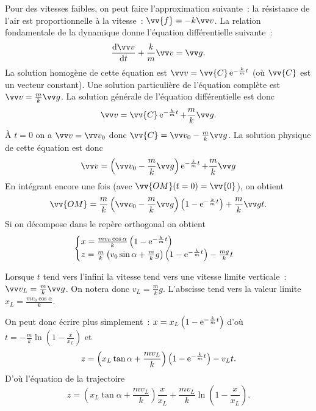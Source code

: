 Pour des vitesses faibles, on peut faire l'approximation suivante~: la résistance de l'air est proportionnelle à la vitesse~: \(\vv{f}=-k \vvv\). La relation fondamentale de la dynamique donne l'équation différentielle suivante~:
\begin{equation}
  \derived{\vvv}{t}+\frac{k}{m}\vvv = \vg.
\end{equation}
La solution homogène de cette équation est \(\vvv = \vv{C}\e^{-\frac{k}{m}t}\) (où \(\vv{C}\) est un vecteur constant). Une solution particulière de l'équation complète est \(\vvv = \frac{m}{k}\vg\). La solution générale de l'équation différentielle est donc
\begin{equation}
  \vvv = \vv{C}\e^{-\frac{k}{m}t} + \frac{m}{k}\vg.
\end{equation}
À \(t=0\) on a \(\vvv=\vvv_0\) donc \(\vv{C}=\vvv_0 - \frac{m}{k}\vg\). La solution physique de cette équation est donc
\begin{equation}
  \vvv = \left( \vvv_0 - \frac{m}{k}\vg \right) \e^{-\frac{k}{m}t} + \frac{m}{k}\vg
\end{equation}
En intégrant encore une fois (avec \(\vv{OM}(t=0)=\vv{0}\)), on obtient
\begin{equation}
  \vv{OM} = \frac{m}{k}\left(\vvv_0 - \frac{m}{k}\vg\right)\left(1 - \e^{-\frac{k}{m}t}\right) + \frac{m}{k}\vg t.
\end{equation}
Si on décompose dans le repère orthogonal on obtient
\begin{equation}
  \begin{cases}
    x = \frac{m v_0 \cos\alpha}{k}\left(1 - \operatorname{e}^{-\frac{k}{m}t}\right) \\
    z = \frac{m}{k}\left(v_0\sin\alpha + \frac{m}{k}g\right) \left(1 - \operatorname{e}^{-\frac{k}{m}t}\right) - \frac{mg}{k}t
  \end{cases}
\end{equation}

Lorsque \(t\) tend vers l'infini la vitesse tend vers une vitesse limite verticale~: \(\vvv_L = \frac{m}{k}\vg\). On notera donc \(v_L = \frac{m}{k}g\). L'abscisse tend vers la valeur limite \(x_L = \frac{mv_0 \cos \alpha}{k}\).

On peut donc écrire plus simplement~: \(x = x_L\left(1-\operatorname{e}^{-\frac{k}{m}t}\right)\) d'où \(t = -\frac{m}{k}\ln\left(1-\frac{x}{x_L}\right)\) et
\begin{equation}
  z = \left(x_L\tan \alpha + \frac{mv_L}{k}\right)\left(1-\operatorname{e}^{-\frac{k}{m}t}\right) -v_L t.
\end{equation}
D'où l'équation de la trajectoire
\begin{equation}
  z = \left(x_L\tan \alpha + \frac{mv_L}{k}\right)\frac{x}{x_L} + \frac{m v_L}{k}\ln\left(1-\frac{x}{x_L}\right).
\end{equation}

